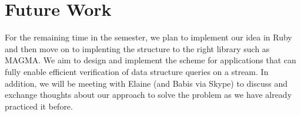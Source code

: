 \documentclass[11pt, letterpaper, oneside]{article}
\begin{document}
\section{Future Work}

For the remaining time in the semester, we plan to implement our idea in Ruby and then move on to implenting the structure to the right library such as MAGMA. We aim to design and implement the scheme for applications that can fully enable efficient verification of data structure queries on a stream.
In addition, we will be meeting with Elaine (and Babis via Skype) to discuss and exchange thoughts about our approach to solve the problem as we have already practiced it before.

\end{document}
